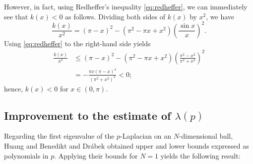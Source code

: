 \documentclass[12pt]{amsart}
\numberwithin{equation}{section}
\theoremstyle{plain}
\theoremstyle{definition}
\theoremstyle{remark}
\begin{document}
However, in fact, using Redheffer's inequality \eqref{eq:redheffer}, 
we can immediately see that $k(x) < 0$ as follows.
%
Dividing both sides of $k(x)$ by $x^2$, we have
\[\frac{k(x)}{x^2}
=(\pi-x)^2-(\pi^2-\pi x +x^2)\left(\frac{\sin{x}}{x}\right)^2.\]
Using \eqref{eq:redheffer} to the right-hand side yields
\begin{align*}
\frac{k(x)}{x^2} 
&\leq (\pi-x)^2-(\pi^2-\pi x +x^2)\left(\frac{\pi^2-x^2}{\pi^2+x^2}\right)^2\\
&=-\frac{\pi x (\pi-x)^4}{(\pi^2+x^2)^2}<0;
\end{align*}
hence, $k(x)<0$ for $x \in (0,\pi)$.
%

\subsection{Improvement to the estimate of $\lambda(p)$}

Regarding the first eigenvalue of the $p$-Laplacian on an $N$-dimensional ball, 
Huang \cite{H1997} and Benedikt and Dr\'{a}bek \cite{BD2012} obtained upper and lower bounds expressed 
as polynomials in $p$. Applying their bounds for $N=1$ yields the following result:
\end{document}
